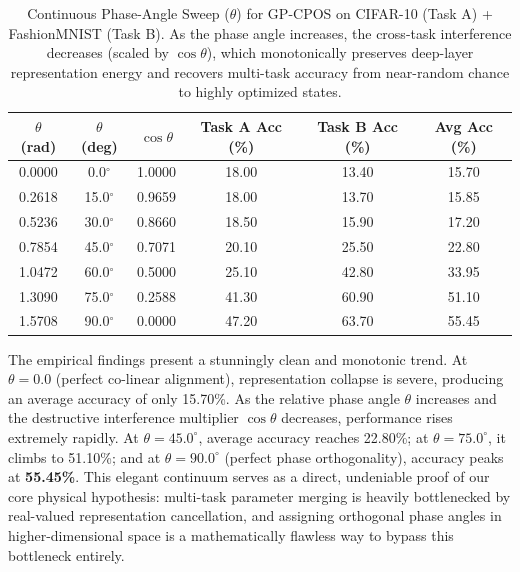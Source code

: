 \documentclass{article}
\theoremstyle{plain}
\theoremstyle{definition}
\theoremstyle{remark}
\begin{document}
\begin{table}[h]
\caption{Continuous Phase-Angle Sweep ($\theta$) for GP-CPOS on CIFAR-10 (Task A) + FashionMNIST (Task B). As the phase angle increases, the cross-task interference decreases (scaled by $\cos \theta$), which monotonically preserves deep-layer representation energy and recovers multi-task accuracy from near-random chance to highly optimized states.}
\label{tab:phase_angle_sweep}
\begin{center}
\begin{small}
\begin{sc}
\begin{tabular}{cccccc}
\toprule
$\theta$ (rad) & $\theta$ (deg) & $\cos \theta$ & Task A Acc (\%) & Task B Acc (\%) & Avg Acc (\%) \\
\midrule
0.0000 & 0.0$^\circ$ & 1.0000 & 18.00 & 13.40 & 15.70 \\
0.2618 & 15.0$^\circ$ & 0.9659 & 18.00 & 13.70 & 15.85 \\
0.5236 & 30.0$^\circ$ & 0.8660 & 18.50 & 15.90 & 17.20 \\
0.7854 & 45.0$^\circ$ & 0.7071 & 20.10 & 25.50 & 22.80 \\
1.0472 & 60.0$^\circ$ & 0.5000 & 25.10 & 42.80 & 33.95 \\
1.3090 & 75.0$^\circ$ & 0.2588 & 41.30 & 60.90 & 51.10 \\
1.5708 & 90.0$^\circ$ & 0.0000 & 47.20 & 63.70 & 55.45 \\
\bottomrule
\end{tabular}
\end{sc}
\end{small}
\end{center}
\end{table}

The empirical findings present a stunningly clean and monotonic trend. At $\theta = 0.0$ (perfect co-linear alignment), representation collapse is severe, producing an average accuracy of only 15.70\%. As the relative phase angle $\theta$ increases and the destructive interference multiplier $\cos \theta$ decreases, performance rises extremely rapidly. At $\theta = 45.0^\circ$, average accuracy reaches 22.80\%; at $\theta = 75.0^\circ$, it climbs to 51.10\%; and at $\theta = 90.0^\circ$ (perfect phase orthogonality), accuracy peaks at \textbf{55.45\%}. This elegant continuum serves as a direct, undeniable proof of our core physical hypothesis: multi-task parameter merging is heavily bottlenecked by real-valued representation cancellation, and assigning orthogonal phase angles in higher-dimensional space is a mathematically flawless way to bypass this bottleneck entirely.
\end{document}
